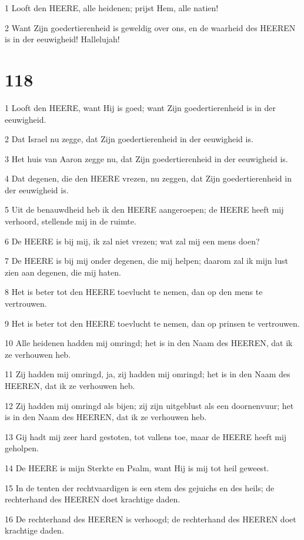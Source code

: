\par 1 Looft den HEERE, alle heidenen; prijst Hem, alle natien!
\par 2 Want Zijn goedertierenheid is geweldig over ons, en de waarheid des HEEREN is in der eeuwigheid! Hallelujah!

\chapter{118}

\par 1 Looft den HEERE, want Hij is goed; want Zijn goedertierenheid is in der eeuwigheid.
\par 2 Dat Israel nu zegge, dat Zijn goedertierenheid in der eeuwigheid is.
\par 3 Het huis van Aaron zegge nu, dat Zijn goedertierenheid in der eeuwigheid is.
\par 4 Dat degenen, die den HEERE vrezen, nu zeggen, dat Zijn goedertierenheid in der eeuwigheid is.
\par 5 Uit de benauwdheid heb ik den HEERE aangeroepen; de HEERE heeft mij verhoord, stellende mij in de ruimte.
\par 6 De HEERE is bij mij, ik zal niet vrezen; wat zal mij een mens doen?
\par 7 De HEERE is bij mij onder degenen, die mij helpen; daarom zal ik mijn lust zien aan degenen, die mij haten.
\par 8 Het is beter tot den HEERE toevlucht te nemen, dan op den mens te vertrouwen.
\par 9 Het is beter tot den HEERE toevlucht te nemen, dan op prinsen te vertrouwen.
\par 10 Alle heidenen hadden mij omringd; het is in den Naam des HEEREN, dat ik ze verhouwen heb.
\par 11 Zij hadden mij omringd, ja, zij hadden mij omringd; het is in den Naam des HEEREN, dat ik ze verhouwen heb.
\par 12 Zij hadden mij omringd als bijen; zij zijn uitgeblust als een doornenvuur; het is in den Naam des HEEREN, dat ik ze verhouwen heb.
\par 13 Gij hadt mij zeer hard gestoten, tot vallens toe, maar de HEERE heeft mij geholpen.
\par 14 De HEERE is mijn Sterkte en Psalm, want Hij is mij tot heil geweest.
\par 15 In de tenten der rechtvaardigen is een stem des gejuichs en des heils; de rechterhand des HEEREN doet krachtige daden.
\par 16 De rechterhand des HEEREN is verhoogd; de rechterhand des HEEREN doet krachtige daden.
